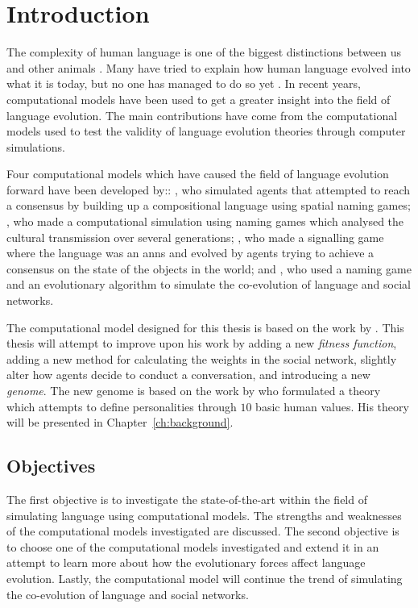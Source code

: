 \acresetall
\chapter{Introduction}
The complexity of human language is one of the biggest distinctions between us and other animals \citep{hauser2002faculty}. Many have tried to explain how human language evolved into what it is today, but no one has managed to do so yet \citep{chomsky1986knowledge, pinker1990natural, muller1861theoretical}. In recent years, computational models have been used to get a greater insight into the field of language evolution. The main contributions have come from the computational models used to test the validity of language evolution theories through computer simulations.

Four computational models which have caused the field of language evolution forward have been developed by:: \citeauthor{gong2011simulating}, who simulated agents that attempted to reach a consensus by building up a compositional language using spatial naming games; \citeauthor{lipowska2011naming}, who made a computational simulation using naming games which analysed the cultural transmission over several generations; \citeauthor{munroe2002learning}, who made a signalling game where the language was an \acp{ann} and evolved by agents trying to achieve a consensus on the state of the objects in the world; and \citeauthor{lekvam2014co}, who used a naming game and an evolutionary algorithm to simulate the co-evolution of language and social networks.

The computational model designed for this thesis is based on the work by \citeauthor{lekvam2014co}. This thesis will attempt to improve upon his work by adding a new \textit{fitness function}, adding a new method for calculating the weights in the social network, slightly alter how agents decide to conduct a conversation, and introducing a new \textit{genome}. The new genome is based on the work by \citeauthor{schwartz1992unniversals} who formulated a theory which attempts to define personalities through $10$ basic human values. His theory will be presented in Chapter~\ref{ch:background}.

\section{Objectives}
The first objective is to investigate the state-of-the-art within the field of simulating language using computational models. The strengths and weaknesses of the computational models investigated are discussed. The second objective is to choose one of the computational models investigated and extend it in an attempt to learn more about how the evolutionary forces affect language evolution. Lastly, the computational model will continue the trend of simulating the co-evolution of language and social networks.

